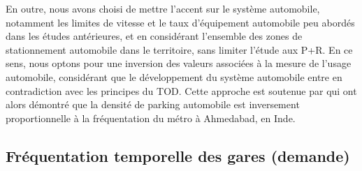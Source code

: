 \begin{refsegment}
En outre, nous avons choisi de mettre l'accent sur le système automobile, notamment les limites de vitesse et le taux d'équipement automobile peu abordés dans les études antérieures, et en considérant l'ensemble des zones de stationnement automobile dans le territoire, sans limiter l'étude aux \acrfull{P+R}. En ce sens, nous optons pour une inversion des valeurs associées à la mesure de l'usage automobile, considérant que le développement du système automobile entre en contradiction avec les principes du \acrshort{TOD}. Cette approche est soutenue par \textcolor{blue}{\textcite[1~020]{maheshwari_evaluating_2022}} qui ont alors démontré que la densité de parking automobile est inversement proportionnelle à la fréquentation du métro à Ahmedabad, en Inde.%

\subsection{Fréquentation temporelle des gares (demande)
    \label{chap6:methodologie-indicateurs-frequentation}
    }


\end{refsegment}

